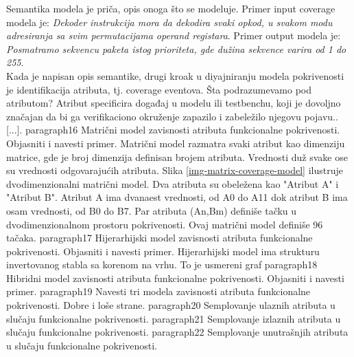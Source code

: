 \indent Semantika modela je priča, opis onoga što se modeluje. Primer input coverage modela je: \textit{Dekoder instrukcija mora da dekodira svaki opkod, u svakom modu adresiranja sa svim permutacijama operand registara}. Primer output modela je: \textit{Posmatramo sekvencu paketa istog prioriteta, gde dužina sekvence varira od 1 do 255}.\\
\indent Kada je napisan opis semantike, drugi kroak u diyajniranju modela pokrivenosti je identifikacija atributa, tj. coverage eventova. Šta podrazumevamo pod atributom? Atribut specificira događaj u modelu ili testbenchu, koji je dovoljno značajan da bi ga verifikaciono okruženje zapazilo i zabeležilo njegovu pojavu..[...].
paragraph{16 Matrični model zavisnosti atributa funkcionalne pokrivenosti. Objasniti i navesti primer.}
\indent Matrični model razmatra svaki atribut kao dimenziju matrice, gde je broj dimenzija definisan brojem atributa. Vrednosti duž svake ose su vrednosti odgovarajućih atributa. Slika \ref{img-matrix-coverage-model} ilustruje dvodimenzionalni matrični model. Dva atributa su obeležena kao "Atribut A" i "Atribut B". Atribut A ima dvanaest vrednosti, od A0 do A11 dok atribut B ima osam vrednosti, od B0 do B7. Par atributa (An,Bm) definiše tačku u dvodimenzionalnom prostoru pokrivenosti. Ovaj matrični model definiše 96 tačaka.
paragraph{17 Hijerarhijski model zavisnosti atributa funkcionalne pokrivenosti. Objasniti i navesti primer.}
\indent Hijerarhijski model ima strukturu invertovanog stabla sa korenom na vrhu. To je usmereni graf
paragraph{18 Hibridni model zavisnosti atributa funkcionalne pokrivenosti. Objasniti i navesti primer.}
paragraph{19 Navesti tri modela zavisnosti atributa funkcionalne pokrivenosti. Dobre i loše strane.}
paragraph{20 Semplovanje ulaznih atributa u slučaju funkcionalne pokrivenosti.}
paragraph{21 Semplovanje izlaznih atributa u slučaju funkcionalne pokrivenosti.}
paragraph{22 Semplovanje unutrašnjih atributa u slučaju funkcionalne pokrivenosti.}
